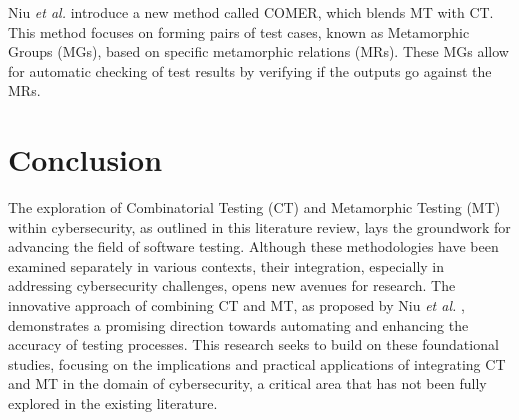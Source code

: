 Niu \textit{et al.} introduce a new method called COMER, which blends MT with CT. This method focuses on forming pairs of test cases, known as Metamorphic Groups (MGs), based on specific metamorphic relations (MRs). These MGs allow for automatic checking of test results by verifying if the outputs go against the MRs.


\section{Conclusion}\label{sec:conclusion}

The exploration of Combinatorial Testing (CT) and Metamorphic Testing (MT) within cybersecurity, as outlined in this literature review, lays the groundwork for advancing the field of software testing. Although these methodologies have been examined separately in various contexts, their integration, especially in addressing cybersecurity challenges, opens new avenues for research. The innovative approach of combining CT and MT, as proposed by Niu \textit{et al.} \cite{comer}, demonstrates a promising direction towards automating and enhancing the accuracy of testing processes. This research seeks to build on these foundational studies, focusing on the implications and practical applications of integrating CT and MT in the domain of cybersecurity, a critical area that has not been fully explored in the existing literature.

\newpage
